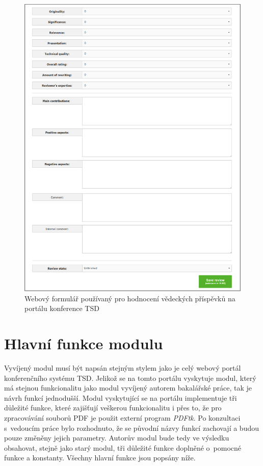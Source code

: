 \begin{figure}[h!]
\centering
\includegraphics[width=15cm]{img/web_formular}
\caption{Webový formulář používaný pro hodnocení vědeckých příspěvků na portálu konference TSD}
\label{fig:web_formular}
\end{figure}

\section{Hlavní funkce modulu}
Vyvíjený modul musí být napsán stejným stylem jako je celý webový portál konferenčního systému TSD. Jelikož se na tomto portálu vyskytuje modul, který má stejnou funkcionalitu jako modul vyvíjený autorem bakalářské práce, tak je návrh funkcí jednodušší. Modul vyskytující se na portálu implementuje tři důležité funkce, které zajišťují veškerou funkcionalitu i přes to, že pro zpracovávání souborů PDF je použit externí program \textit{PDFtk}. Po konzultaci s~vedoucím práce bylo rozhodnuto, že se původní názvy funkcí zachovají a budou pouze změněny jejich parametry. Autorův modul bude tedy ve výsledku obsahovat, stejně jako starý modul, tři důležité funkce doplněné o~pomocné funkce a konstanty. Všechny hlavní funkce jsou popsány níže.  

